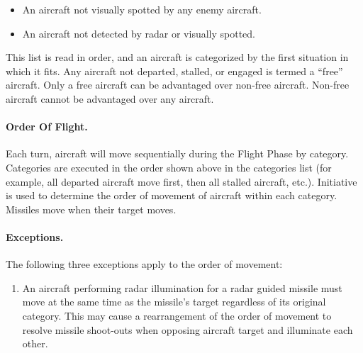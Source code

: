 {\begin{itemize}
    \item{} An aircraft not visually spotted by any enemy aircraft.

    \item{} An aircraft not detected by radar or visually spotted.

\end{itemize}

\Ax{
    
}

This list is read in order, and an aircraft is categorized by the first situation in which it fits. Any aircraft not departed, stalled, or engaged is termed a “free” aircraft. Only a free aircraft can be advantaged over non-free aircraft. Non-free aircraft cannot be advantaged over any aircraft.



\paragraph{Order Of Flight.} Each turn, aircraft will move sequentially during the Flight Phase by category. Categories are executed in the order shown above in the categories list (for example, all departed aircraft move first, then all stalled aircraft, etc.). Initiative is used to determine the order of movement of aircraft within each category. Missiles move when their target moves.

\paragraph{Exceptions.} The following three exceptions apply to the order of movement:

\begin{enumerate}

    \item{} An aircraft performing radar illumination for a radar guided missile must move at the same time as the missile's target regardless of its original category. This may cause a rearrangement of the order of movement to resolve missile shoot-outs when opposing aircraft target and illuminate each other.


\end{enumerate}}
